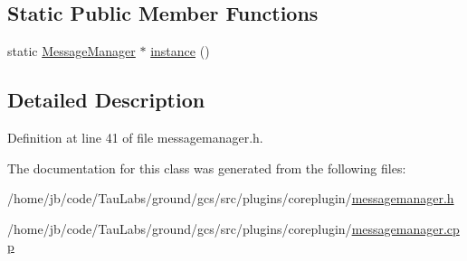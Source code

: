 \subsection*{\-Static \-Public \-Member \-Functions}
\begin{DoxyCompactItemize}
\item 
static \hyperlink{class_core_1_1_message_manager}{\-Message\-Manager} $\ast$ \hyperlink{group___core_plugin_ga186a2b8a42ce68a6c42dacfe025b559e}{instance} ()
\end{DoxyCompactItemize}


\subsection{\-Detailed \-Description}


\-Definition at line 41 of file messagemanager.\-h.



\-The documentation for this class was generated from the following files\-:\begin{DoxyCompactItemize}
\item 
/home/jb/code/\-Tau\-Labs/ground/gcs/src/plugins/coreplugin/\hyperlink{messagemanager_8h}{messagemanager.\-h}\item 
/home/jb/code/\-Tau\-Labs/ground/gcs/src/plugins/coreplugin/\hyperlink{messagemanager_8cpp}{messagemanager.\-cpp}\end{DoxyCompactItemize}
